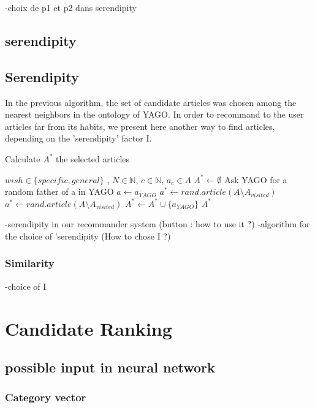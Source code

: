 \documentclass[11pt]{article}
\theoremstyle{plain}
\theoremstyle{definition}
\theoremstyle{remark}
\begin{document}
-choix de p1 et p2 dans serendipity

\newpage
\subsection{serendipity}
\subsection{Serendipity}

In the previous algorithm, the set of candidate articles was chosen among the nearest neighbors in the ontology of YAGO.
In order to recommand to the user articles far from its habits, we present here another way to find articles, depending on the 'serendipity' factor I.
\begin{algorithm}
  \caption{Calculate $A^*$ the selected articles}
  \begin{algorithmic}
    \REQUIRE $wish \in \{specific , general\}$ , $N \in \mathbb{N}$, $c \in \mathbb{N}$, $a_c\in A$
    \STATE $A^* \leftarrow \emptyset$
    \STATE Ask YAGO for a random father of a in YAGO 
    \STATE $a \leftarrow a_{YAGO}$ 
    \ENDWHILE
    \STATE $a^* \leftarrow rand.article(A\setminus A_{visited})$
    \STATE $a^*\leftarrow rand.article(A\setminus A_{visited})$
    \ENDWHILE
    \STATE $ A^* \leftarrow A^* \cup \{a_{YAGO}\}$
    \ENDWHILE
    \RETURN $A^*$
  \end{algorithmic}
\end{algorithm}

-serendipity in our recommander system (button : how to use it ?)
-algorithm for the choice of 'serendipity (How to chose I ?)
\subsubsection{Similarity}

-choice of I


\section{Candidate Ranking}

\subsection{possible input in neural network}

\subsubsection{Category vector}
\end{document}
